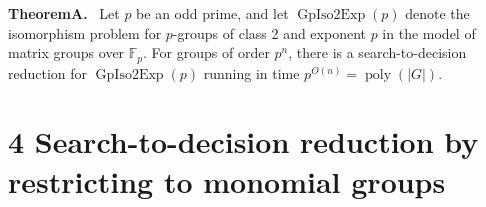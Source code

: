\documentclass[10pt,a4paper]{article}
\newenvironment{authorclaim}[1]{\par\medskip\noindent\textbf{#1.}\ }{\par\medskip}
\begin{document}
\begin{authorclaim}{TheoremA}
Let $p$ be an odd prime, and let $\operatorname{GpIso2Exp}(p)$ denote the isomorphism problem for $p$-groups of class 2 and exponent $p$ in the model of matrix groups over $\mathbb F_p$. For groups of order $p^n$, there is a search-to-decision reduction for $\operatorname{GpIso2Exp}(p)$ running in time $p^{O(n)}=\operatorname{poly}(|G|)$.
\end{authorclaim}

\section*{4 Search-to-decision reduction by restricting to monomial groups}
\end{document}

